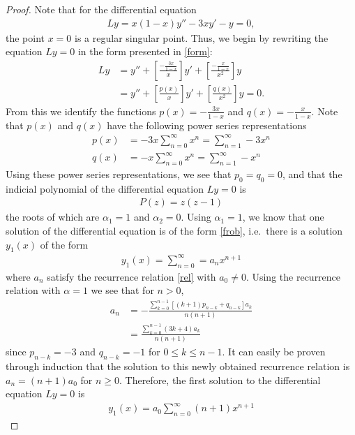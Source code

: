 \documentclass[12pt]{article}
\theoremstyle{definition}
\begin{document}
\begin{proof}
  Note that for the differential equation
  \begin{align*}
    Ly = x(1-x)y'' - 3xy'-y = 0,
  \end{align*}
  the point $x=0$ is a regular singular point. Thus, we begin by rewriting the equation $Ly=0$
  in the form presented in \eqref{form}:
  \begin{align*}
    Ly &= y'' + \left[\frac{-\frac{3x}{1-x}}{x}\right]y' + \left[\frac{-\frac{x}{1-x}}{x^2}\right]y \\
    &= y'' + \left[\frac{p(x)}{x}\right]y' + \left[\frac{q(x)}{x^2}\right]y = 0.
  \end{align*}
  From this we identify the functions $p(x) = -\frac{3x}{1-x}$ and $q(x) = -\frac{x}{1-x}$. Note that
  $p(x)$ and $q(x)$ have the following power series representations
  \begin{align*}
    p(x) &= -3x\sum_{n=0}^\infty x^n = \sum_{n=1}^\infty -3 x^{n} \\
    q(x) &= -x\sum_{n=0}^\infty x^n = \sum_{n=1}^\infty - x^{n}
  \end{align*}
  Using these power series representations, we see that $p_0 = q_0 = 0$, and that the indicial polynomial of
  the differential equation $Ly=0$ is
  \begin{align*}
    P(z) = z(z-1)
  \end{align*}
  the roots of which are $\alpha_1 = 1$ and $\alpha_2 = 0$. Using $\alpha_1 = 1$, we know that one solution of
  the differential equation is of the form \eqref{frob}, i.e.\ there is a solution $y_1(x)$ of the form
  \begin{align*}
    y_1(x) = \sum_{n=0}^\infty = a_n x^{n+1}
  \end{align*}
  where $a_n$ satisfy the recurrence relation \eqref{rel} with $a_0 \neq 0$. Using the recurrence relation with $\alpha = 1$ we see that for $n>0$,
  \begin{align*}
    a_n &= -\frac{\sum_{k=0}^{n-1} [(k+1)p_{n-k} + q_{n-k}]a_k}{n(n+1)} \\
    &= \frac{\sum_{k=0}^{n-1} (3k + 4)a_k}{n(n+1)}
  \end{align*}
  since $p_{n-k} = -3$ and $q_{n-k} = -1$ for $0\leq k \leq n-1$. It can easily be proven through induction that the solution to this newly obtained recurrence
  relation is $a_n = (n+1)a_0$ for $n\geq0$. Therefore, the first solution to the differential equation $Ly=0$ is
  \begin{align*}
    y_1(x) = a_0 \sum_{n=0}^\infty (n+1)x^{n+1}
  \end{align*}


\end{proof}
\end{document}
